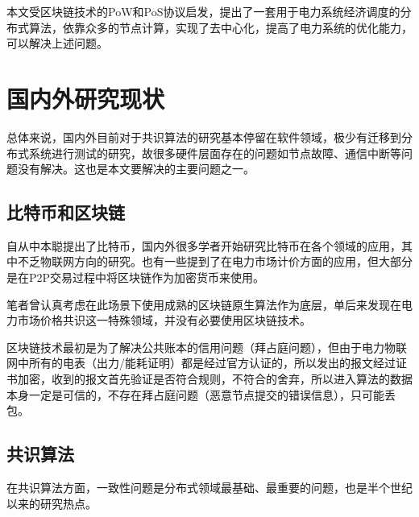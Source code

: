 

本文受区块链技术的PoW和PoS协议启发，提出了一套用于电力系统经济调度的分布式算法，依靠众多的节点计算，实现了去中心化，提高了电力系统的优化能力，可以解决上述问题。

\section{国内外研究现状}

总体来说，国内外目前对于共识算法的研究基本停留在软件领域，极少有迁移到分布式系统进行测试的研究，故很多硬件层面存在的问题如节点故障、通信中断等问题没有解决。这也是本文要解决的主要问题之一。

\subsection{比特币和区块链}

自从中本聪提出了比特币\cite{nakamoto2008bitcoin}，国内外很多学者开始研究比特币在各个领域的应用，其中不乏物联网方向的研究\cite{zhang2017iot}。也有一些提到了在电力市场计价方面的应用，但大部分是在P2P交易过程中将区块链作为加密货币来使用\cite{tai2016electricity}。

笔者曾认真考虑在此场景下使用成熟的区块链原生算法作为底层，单后来发现在电力市场价格共识这一特殊领域，并没有必要使用区块链技术。

区块链技术最初是为了解决公共账本的信用问题（拜占庭问题），但由于电力物联网中所有的电表（出力/能耗证明）都是经过官方认证的，所以发出的报文经过证书加密，收到的报文首先验证是否符合规则，不符合的舍弃，所以进入算法的数据本身一定是可信的，不存在拜占庭问题（恶意节点提交的错误信息），只可能丢包。

\subsection{共识算法}

在共识算法方面，一致性问题是分布式领域最基础、最重要的问题，也是半个世纪以来的研究热点。



